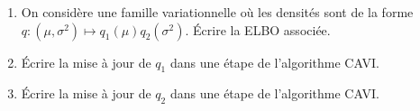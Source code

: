 \documentclass[a4paper,10pt,fleqn]{article}
\newcommand{\1}{\ensuremath{\mathbbm{1}}}
\begin{document}
\begin{enumerate}
\item On consid\`ere une famille variationnelle o\`u les densit\'es sont de la forme $q:(\mu,\sigma^2)\mapsto q_1(\mu)q_{2}(\sigma^2)$. \'Ecrire la ELBO associ\'ee.
%
%
\item \'Ecrire la mise \`a jour de $q_1$ dans une \'etape de l'algorithme CAVI. 
%
%
\item \'Ecrire la mise \`a jour de $q_{2}$ dans une \'etape de l'algorithme CAVI. 
%
%
\end{enumerate}
\end{document}

